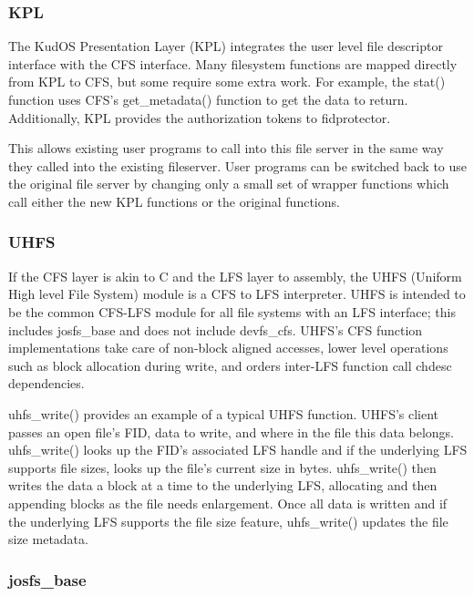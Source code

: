 \subsubsection{KPL}

The KudOS Presentation Layer (KPL) integrates the user level file descriptor
interface with the CFS interface. Many filesystem functions are mapped directly
from KPL to CFS, but some require some extra work. For example, the stat()
function uses CFS's get\_metadata() function to get the data to return.
Additionally, KPL provides the authorization tokens to fidprotector.

This allows existing user programs to call into this file server in the same way
they called into the existing fileserver. User programs can be switched back to
use the original file server by changing only a small set of wrapper functions
which call either the new KPL functions or the original functions.

\subsubsection{UHFS}
\label{sec:solution:impl:uhfs}

If the CFS layer is akin to C and the LFS layer to assembly, the UHFS (Uniform
High level File System) module is a CFS to LFS interpreter. UHFS is intended to
be the common CFS-LFS module for all file systems with an LFS interface; this
includes josfs\_base and does not include devfs\_cfs. UHFS's CFS function
implementations take care of non-block aligned accesses, lower level operations
such as block allocation during write, and orders inter-LFS function call chdesc
dependencies.

uhfs\_write() provides an example of a typical UHFS function. UHFS's client
passes an open file's FID, data to write, and where in the file this data
belongs. uhfs\_write() looks up the FID's associated LFS handle and if the
underlying LFS supports file sizes, looks up the file's current size in bytes.
uhfs\_write() then writes the data a block at a time to the underlying LFS,
allocating and then appending blocks as the file needs enlargement. Once all
data is written and if the underlying LFS supports the file size feature,
uhfs\_write() updates the file size metadata.

\subsubsection{josfs\_base}
\label{sec:solution:impl:base}

